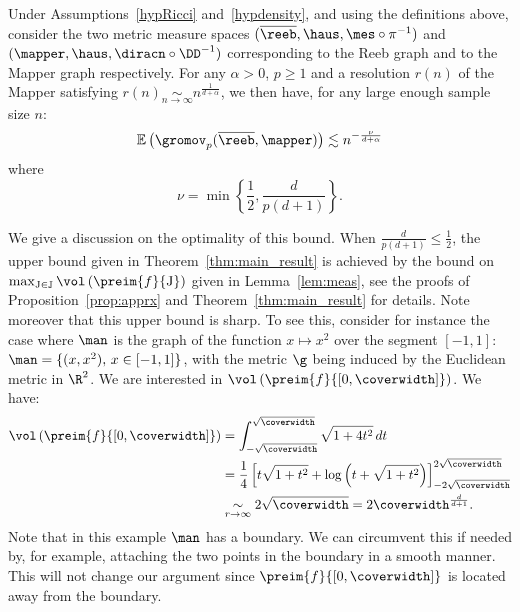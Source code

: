 \begin{theorem}\label{thm:main_result}
Under %
Assumptions~\ref{hypRicci} and~\ref{hypdensity}, and using the definitions above, 
consider the two metric measure spaces $(\overline{\reeb},\haus,\mes\circ\pi^{-1})$ and $(\mapper,\haus,\diracn\circ\DD^{-1})$ corresponding to the Reeb graph and to the Mapper graph respectively.  
For any $\alpha>0$, $p \geq 1$ and a resolution $r(n)$ of the Mapper satisfying $r(n)\underset{n\rightarrow\infty}{\sim}n^{\frac{1}{d+\alpha}}$, we then have, for any large enough sample size $n$:
 $$\mathbb{E}\left(\gromov_p(\overline{\reeb},\mapper)\right)\lesssim n^{-\frac{\nu}{d+\alpha}} $$
 where $$\nu=\min\left\{\frac{1}{2},\frac{d}{p(d+1)}\right\}.$$ 
\end{theorem}

\begin{remark}We give a discussion on the optimality of this bound. When $\frac{d}{p(d+1)}\leq\frac{1}{2}$, the upper bound given in Theorem~\ref{thm:main_result} is achieved by the bound on $\max_{\mathrm{J}\in\mathbb{J}}\vol\left( \preim{f}{\mathrm{J}}\right)$ given in Lemma~\ref{lem:meas}, see the proofs of Proposition~\ref{prop:apprx} and Theorem~\ref{thm:main_result} for details. Note moreover that this upper bound  is sharp. To see this, consider for instance the case where $\man$ is the graph of the function $x\mapsto x^2$ over the segment $[-1,1]$: $\man=\{(x,x^2),\,x\in[-1,1]\}$, with the metric $\g$ being induced by the Euclidean metric in $\R^2$. We are interested in $\vol\left( \preim{f}{[0,\coverwidth]}\right)$. We have:
\begin{align*}
\vol\left( \preim{f}{[0,\coverwidth]}\right)&=\int_{-\sqrt{\coverwidth}}^{\sqrt{\coverwidth}}\sqrt{1+4t^2}\,dt\\
&=\frac{1}{4}\left[t\sqrt{1+t^2}+\log\left(t+\sqrt{1+t^2}\right)\right]^{2\sqrt{\coverwidth}}_{-2\sqrt{\coverwidth}}\\
&\underset{r\rightarrow\infty}{\sim}2\sqrt{\coverwidth}=2\coverwidth^{\frac{d}{d+1}}.
\end{align*}
Note that in this example $\man$ has a boundary. We can circumvent this if needed by, for example, attaching the two points in the boundary in a smooth manner. This will not change our argument since $\preim{f}{[0,\coverwidth]}$ is located away from the boundary.
\end{remark}


